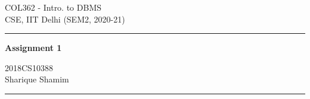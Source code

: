 \documentclass{exam}
\begin{document}
\begin{minipage}{0.295\textwidth} %
\raggedright
COL362 - Intro. to DBMS\\ %
\footnotesize %
CSE, IIT Delhi (SEM2, 2020-21) %
\medskip\hrule
\end{minipage}
\begin{minipage}{0.4\textwidth} %
\centering 
\large %
\textbf{Assignment 1}\\ %
\normalsize %
\end{minipage}
\begin{minipage}{0.295\textwidth} %
\raggedleft
2018CS10388\\ %
\footnotesize
Sharique Shamim %
\medskip\hrule
\end{minipage}
\vspace{0.1in}
\end{document}
